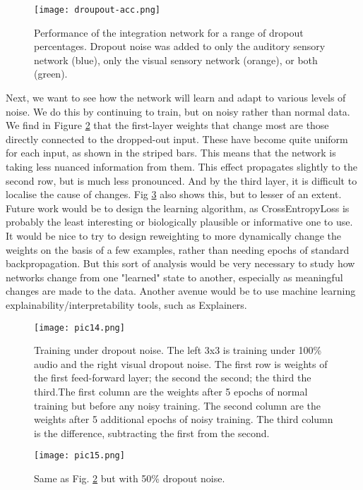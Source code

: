 \documentclass[conference]{IEEEtran}
\begin{document}
\begin{figure}[htbp]
\centerline{\texttt{[image: droupout-acc.png]}}
\caption{Performance of the integration network for a range of dropout percentages. Dropout noise was added to only the auditory sensory network (blue), only the visual sensory network (orange), or both (green).}
\label{figacc}
\end{figure}

Next, we want to see how the network will learn and adapt to various levels of noise. We do this by continuing to train, but on noisy rather than normal data. We find in Figure \ref{fig11} that the first-layer weights that change most are those directly connected to the dropped-out input. These have become quite uniform for each input, as shown in the striped bars. This means that the network is taking less nuanced information from them. This effect propagates slightly to the second row, but is much less pronounced. And by the third layer, it is difficult to localise the cause of changes. Fig \ref{fig7} also shows this, but to lesser of an extent. Future work would be to design the learning algorithm, as CrossEntropyLoss is probably the least interesting or biologically plausible or informative one to use. It would be nice to try to design reweighting to more dynamically change the weights on the basis of a few examples, rather than needing epochs of standard backpropagation. But this sort of analysis would be very necessary to study how networks change from one "learned" state to another, especially as meaningful changes are made to the data. Another avenue would be to use machine learning explainability/interpretability tools, such as Explainers.

\begin{figure}[htbp]
\centerline{\texttt{[image: pic14.png]}}
\caption{Training under dropout noise. The left 3x3 is training under 100\% audio and the right visual dropout noise. The first row is weights of the first feed-forward layer; the second the second; the third the third.The first column are the weights after 5 epochs of normal training but before any noisy training. The second column are the weights after 5 additional epochs of noisy training. The third column is the difference, subtracting the first from the second.}
\label{fig11}
\end{figure}

\begin{figure}[htbp]
\centerline{\texttt{[image: pic15.png]}}
\caption{Same as Fig. \ref{fig11} but with 50\% dropout noise.}
\label{fig7}
\end{figure}
\end{document}
